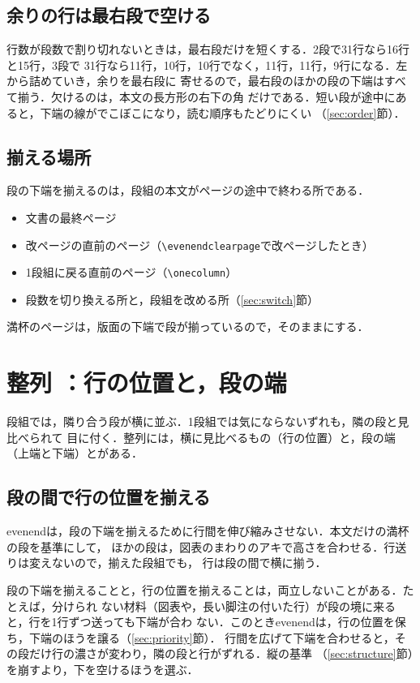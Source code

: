 \documentclass[twocolumn,paper=a4,fontsize=10pt]{jlreq}
\newcommand\nidan{\evenendcolumns[columnsep=2\zw]{2}}
\newcommand\cs[1]{\texttt{\textbackslash #1}}
\begin{document}
\subsection{余りの行は最右段で空ける}

行数が段数で割り切れないときは，最右段だけを短くする．2段で31行なら16行と15行，3段で
31行なら11行，10行，10行でなく，11行，11行，9行になる．左から詰めていき，余りを最右段に
寄せるので，最右段のほかの段の下端はすべて揃う．欠けるのは，本文の長方形の右下の角
だけである．短い段が途中にあると，下端の線がでこぼこになり，読む順序もたどりにくい
（\ref{sec:order}節）．

\subsection{揃える場所}

段の下端を揃えるのは，段組の本文がページの途中で終わる所である．
\begin{itemize}
  \item 文書の最終ページ
  \item 改ページの直前のページ（\cs{evenendclearpage}で改ページしたとき）
  \item 1段組に戻る直前のページ（\cs{onecolumn}）
  \item 段数を切り換える所と，段組を改める所（\ref{sec:switch}節）
\end{itemize}
満杯のページは，版面の下端で段が揃っているので，そのままにする．

\nidan
\section{整列
：行の位置と，段の端}\label{sec:align}

段組では，隣り合う段が横に並ぶ．1段組では気にならないずれも，隣の段と見比べられて
目に付く．整列には，横に見比べるもの（行の位置）と，段の端（上端と下端）とがある．

\subsection{段の間で行の位置を揃える}

evenendは，段の下端を揃えるために行間を伸び縮みさせない．本文だけの満杯の段を基準にして，
ほかの段は，図表のまわりのアキで高さを合わせる．行送りは変えないので，揃えた段組でも，
行は段の間で横に揃う．

段の下端を揃えることと，行の位置を揃えることは，両立しないことがある．たとえば，分けられ
ない材料（図表や，長い脚注の付いた行）が段の境に来ると，行を1行ずつ送っても下端が合わ
ない．このときevenendは，行の位置を保ち，下端のほうを譲る（\ref{sec:priority}節）．
行間を広げて下端を合わせると，その段だけ行の濃さが変わり，隣の段と行がずれる．縦の基準
（\ref{sec:structure}節）を崩すより，下を空けるほうを選ぶ．
\end{document}
